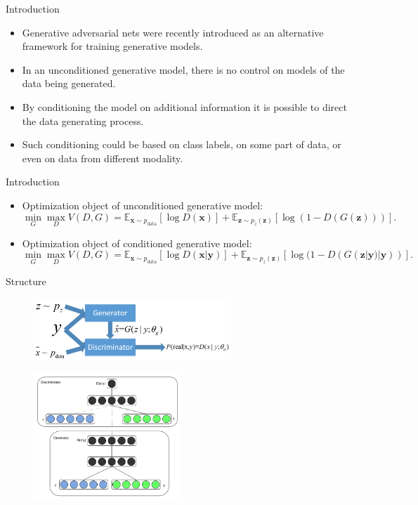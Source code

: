 \documentclass[10pt]{beamer}
\begin{document}
	\begin{frame}{Introduction}
		\begin{itemize}
			\item Generative adversarial nets were recently introduced as an alternative framework for training generative models.
			\item In an unconditioned generative model, there is no control on models of the data being generated.
			\item By conditioning the model on additional information it is possible to direct the data generating process.
			\item Such conditioning could be based on class labels, on some part of data, or even on data from different modality.
		\end{itemize}
	\end{frame}

	\begin{frame}{Introduction}
		\begin{itemize}
			\item Optimization object of unconditioned generative model:
			$$
			\mathop{\min}_{G}\mathop{\max}_{D}V(D,G)=\mathbb{E}_{\bm{x}\sim p_{\text{data}}}\left[\log D(\bm{x})\right]+\mathbb{E}_{\bm{z}\sim p_z(\bm{z})}\left[\log(1-D(G(\bm{z})))\right].
			$$
			\item Optimization object of conditioned generative model:
			$$
			\mathop{\min}_{G}\mathop{\max}_{D}V(D,G)=\mathbb{E}_{\bm{x}\sim p_{\text{data}}}\left[\log D(\bm{x}|\bm{y})\right]+\mathbb{E}_{\bm{z}\sim p_z(\bm{z})}\left[\log(1-D(G(\bm{z}|\bm{y})|\bm{y}))\right].
			$$
		\end{itemize}
	\end{frame}

	\begin{frame}{Structure}
		\begin{figure}
			\includegraphics[width=20em]{figures/CGAN-general-structure.png}
		\end{figure}
		\begin{figure}
			\includegraphics[width=15em]{figures/CGAN-origin-structure.png}
		\end{figure}
	\end{frame}
\end{document}
